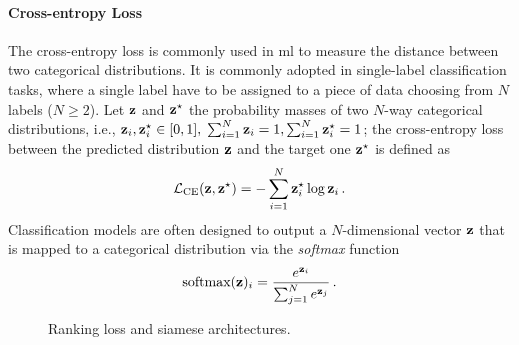 \paragraph{Cross-entropy Loss}
The cross-entropy loss is commonly used in \gls{ml} to measure the distance between two categorical distributions.
It is commonly adopted in single-label classification tasks, where a single label have to be assigned to a piece of data choosing from $N$ labels ($N \geq 2$).
Let $\mathbf{z}$ and $\mathbf{z}^\star$ the probability masses of two $N$-way categorical distributions, i.e., $\mathbf{z}_i, \mathbf{z}^\star_i \in [0,1],\; \sum_{i=1}^N \mathbf{z}_i = 1, \sum_{i=1}^N \mathbf{z}^\star_i = 1$;
the cross-entropy loss between the predicted distribution $\mathbf{z}$ and the target one $\mathbf{z}^\star$ is defined as
%
\begin{equation} \label{eq:back:cross-entropy}
    \mathcal{L}_\text{CE}(\mathbf{z}, \mathbf{z}^\star) = - \sum_{i=1}^N \mathbf{z}^\star_i \log \mathbf{z}_i \,.
\end{equation}
%
Classification models are often designed to output a $N$-dimensional vector $\mathbf{z}$ that is mapped to a categorical distribution via the \emph{softmax} function
%
\begin{equation} \label{eq:back:softmax}
    \text{softmax}(\mathbf{z})_i = \frac{e^{\mathbf{z}_i}}{\sum_{j=1}^N e^{\mathbf{z}_j}} \,.
\end{equation}

\begin{figure}
    \vspace{1em}
    \caption{Ranking loss and siamese architectures.}
    \label{fig:back:learn-to-rank}
\end{figure}

